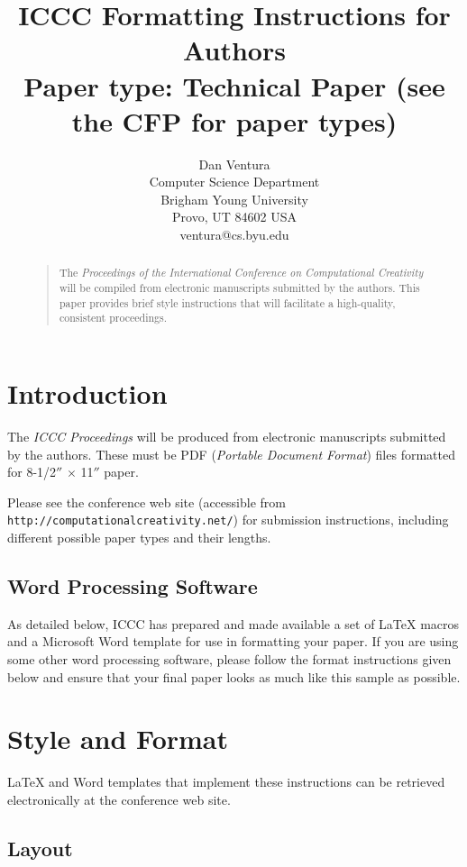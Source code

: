 \documentclass[letterpaper]{article}
\title{ICCC Formatting Instructions for Authors \\
Paper type: Technical Paper (see the CFP for paper types)}
\author{Dan Ventura\\
Computer Science Department\\
Brigham Young University\\
Provo, UT 84602  USA\\
ventura@cs.byu.edu\\
}
\begin{document}
 
\maketitle
\begin{abstract}
\begin{quote}
The {\em Proceedings of the International Conference on Computational Creativity} will be compiled from electronic manuscripts submitted by the authors.  This paper provides brief style instructions that will facilitate a high-quality, consistent proceedings.
\end{quote}
\end{abstract}

\section{Introduction}

The {\it ICCC Proceedings} will be produced from electronic
manuscripts submitted by the authors. These must be PDF ({\em Portable
Document Format}) files formatted for 8-1/2$''$ $\times$ 11$''$ paper.

Please see the conference web site 
(accessible from {\small \tt http://computationalcreativity.net/})
for submission instructions, including 
different possible paper types and their lengths.

\subsection{Word Processing Software}

As detailed below, ICCC has prepared and made available a set of
\LaTeX{} macros and a Microsoft Word template for use in formatting
your paper. If you are using some other word processing software, please follow the format instructions given below and ensure that your final paper looks as much like this sample as possible.

\section{Style and Format}

\LaTeX{} and Word templates that implement these instructions
can be retrieved electronically at the conference web site.

\subsection{Layout}
\end{document}
